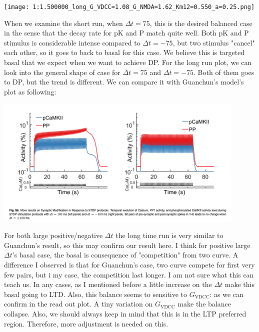 \documentclass{article}
\begin{document}
\begin{minipage}{\textwidth} %
    \centering
    \texttt{[image: 1:1.500000\_long\_G\_VDCC=1.08\_G\_NMDA=1.62\_Km12=0.550\_a=0.25.png]} %
    \label{fig:a0.25}
\end{minipage}
When we examine the short run, when $\Delta t=75$, this is the desired balanced case in the sense that the decay rate for pK and P match quite well. Both pK and P stimulus is considerable intense compared to $\Delta t=-75$, but two stimulus "cancel" each other, so it goes to back to basal for this case. We believe this is targeted basal that we expect when we want to achieve DP. For the long run plot, we can look into the general shape of case for $\Delta t=75$ and $\Delta t=-75$. Both of them goes to DP, but the trend is different. We can compare it with Guanchun's model's plot as following:\\
\begin{minipage}{\textwidth} %
    \centering
    \includegraphics[width=0.9\textwidth]{guanchun's plot.png} %
    \label{fig:a0.25}
\end{minipage}
For both large positive/negative $\Delta t$ the long time run is very similar to Guanchun's result, so this may confirm our result here. I think for positive large $\Delta t$'s basal case, the basal is consequence of "competition" from two curve. A difference I observed is that for Guanchun's case, two curve compete for first very few pairs, but i my case, the competition last longer. I am not sure what this can teach us. In any cases, as I mentioned before a little increase on the $\Delta t$ make this basal going to LTD. Also, this balance seems to sensitive to $G_{\text{VDCC}}$: as we can confirm in the read out plot. A tiny variation on $G_{\text{VDCC}}$ make the balance collapse. Also, we should always keep in mind that this is in the LTP preferred region. Therefore, more adjustment is needed on this.
\end{document}
